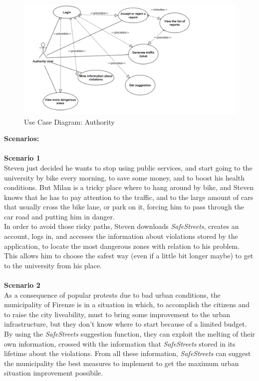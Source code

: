     
     \begin{figure}[H]
          \includegraphics[width=1.5\textwidth,left]{Images/UCD_aut_bis.PNG}
        \caption{Use Case Diagram: Authority}
    \end{figure}


\vspace{18mm}
\textbf{Scenarios:}\\\\
\textbf{Scenario 1}\\
Steven just decided he wants to stop using public services, and start going to the university by bike every morning, to save some money, and to boost his health conditions. But Milan is a tricky place where to hang around by bike, and Steven knows that he has to pay attention to the traffic, and to the large amount of cars that usually cross the bike lane, or park on it, forcing him to pass through the car road and putting him in danger. \\
In order to avoid those risky paths, Steven downloads \textit{SafeStreets}, creates an account, logs in, and accesses the information about violations stored by the application, to locate the most dangerous zones with relation to his problem. This allows him to choose the safest way (even if a little bit longer maybe) to get to the university from his place.\\\\

\noindent\textbf{Scenario 2}\\
As a consequence of popular protests due to bad urban conditions, the municipality of Firenze is in a situation in which, to accomplish the citizens and to raise the city liveability, must to bring some improvement to the urban infrastructure, but they don't know where to start because of a limited budget.\\
By using the \textit{SafeStreets} suggestion function, they can exploit the melting of their own information, crossed with the information that \textit{SafeStreets} stored in its lifetime about the violations. From all these information, \textit{SafeStreets} can suggest the municipality the best measures to implement to get the maximum urban situation improvement possibile.  \\


